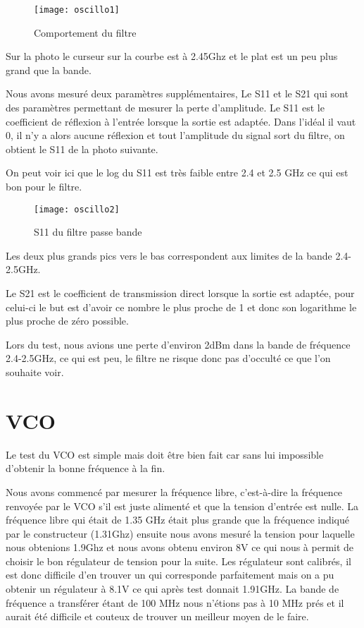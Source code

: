 \begin{figure}[h]
  \centering
  \texttt{[image: oscillo1]}
  \caption{Comportement du filtre}
  \label{fig:comportement}
\end{figure}

Sur la photo le curseur sur la courbe est à 2.45Ghz et le plat est un peu plus grand que la bande.

Nous avons mesuré deux paramètres supplémentaires, Le S11 et le S21 qui sont des paramètres permettant de mesurer la perte d’amplitude. Le S11 est le coefficient de réflexion à l'entrée lorsque la sortie est adaptée. Dans l’idéal il vaut 0, il n’y a alors aucune réflexion et tout l’amplitude du signal sort du filtre, on obtient le S11 de la photo suivante.

On peut voir ici que le log du S11 est très faible entre 2.4 et 2.5 GHz ce qui est bon pour le filtre.

\begin{figure}[h]
  \centering
  \texttt{[image: oscillo2]}
  \caption{S11 du filtre passe bande}
  \label{fig:filtre}
\end{figure}


Les deux plus grands pics vers le bas correspondent aux limites de la bande 2.4-2.5GHz.

Le S21 est le coefficient de transmission direct lorsque la sortie est adaptée, pour celui-ci le but est d’avoir ce nombre le plus proche de 1 et donc son logarithme le plus proche de zéro possible.

Lors du test, nous avions une perte d’environ 2dBm dans la bande de fréquence 2.4-2.5GHz, ce qui est peu, le filtre ne risque donc pas d’occulté ce que l’on souhaite voir.
\newpage
\section{VCO}



Le test du VCO est simple mais doit être bien fait car sans lui impossible d’obtenir la bonne fréquence à la fin.

Nous avons commencé par mesurer la fréquence libre, c’est-à-dire la fréquence renvoyée par le VCO s’il est juste alimenté et que la tension d’entrée est nulle. La fréquence libre qui était de 1.35 GHz était plus grande que la fréquence indiqué par le constructeur (1.31Ghz) ensuite nous avons mesuré la tension pour laquelle nous obtenions 1.9Ghz et nous avons obtenu environ 8V ce qui nous à permit de choisir le bon régulateur de tension pour la suite. Les régulateur sont calibrés, il est donc difficile d’en trouver un qui corresponde parfaitement mais on a pu obtenir un régulateur à 8.1V ce qui après test donnait 1.91GHz. La bande de fréquence a transférer étant de 100 MHz nous n’étions pas à 10 MHz prés et il aurait été difficile et couteux de trouver un meilleur moyen de le faire.


